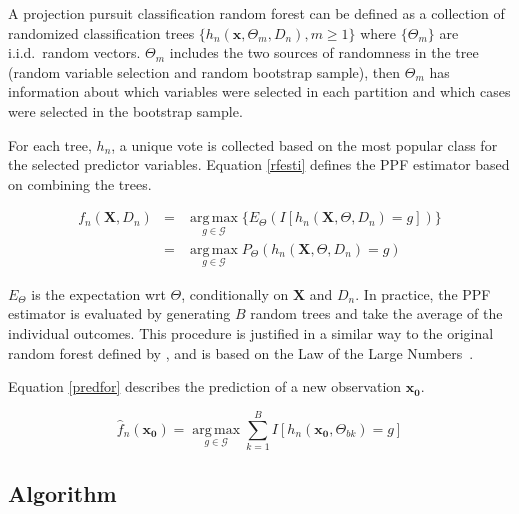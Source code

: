 \documentclass[12pt]{article}\usepackage[]{graphicx}\usepackage[]{color}
\begin{document}
 A projection pursuit classification random forest can be defined as a collection of randomized classification trees $\{h_n(\mathbf{x}, \Theta_m, D_n), m\geq 1\}$  where $\{\Theta_m\}$ are i.i.d.~random vectors. $\Theta_m$ includes the two sources of randomness in the tree (random variable selection and random bootstrap sample), then $\Theta_m$ has information about which variables were selected in each partition and which cases were selected in the bootstrap sample.

For each tree, $h_n$, a unique vote is collected based on the most popular class for the selected predictor variables.  Equation \ref{rfesti} defines the PPF estimator based on combining the trees.

\begin{eqnarray}\label{rfesti}
f_n(\mathbf{X}, D_n )&=& \operatorname*{arg\,max}_{g\in \mathscr{G}} \{E_{\Theta}(I[h_n(\mathbf{X}, \Theta, D_n)=g])\}\\ \nonumber
&=& \operatorname*{arg\,max}_{g\in \mathscr{G}} P_{\Theta}(h_n(\mathbf{X}, \Theta, D_n)=g)
\end{eqnarray}

\noindent $E_{\Theta}$ is the expectation wrt $\Theta$, conditionally on $\mathbf{X}$ and $D_n$.
In practice, the PPF estimator is evaluated by generating $B$ random trees and take the average of the individual outcomes. This procedure is justified in a similar way to the original random forest defined by \cite{breiman2001random}, and is based on the Law of the Large Numbers~\citep{athreya2006measure}.

Equation \ref{predfor} describes the prediction of a new observation $\mathbf{x_0}$.

\begin{equation}
\hat f_n(\mathbf{x_0})= \operatorname*{arg\,max}_{g\in \mathscr{G}} \sum_{k=1}^B I [ h_n (\mathbf{x_0}, \Theta_{bk} )= g]
\label{predfor}
\end{equation}

\subsection{Algorithm }
\end{document}
